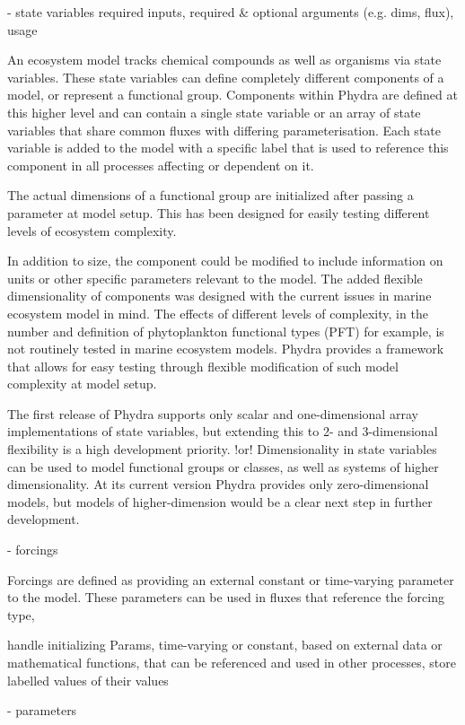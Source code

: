 \documentclass[journal abbreviation, manuscript]{copernicus}
\begin{document}
- state variables
required inputs, required \& optional arguments (e.g. dims, flux), usage

An ecosystem model tracks chemical compounds as well as organisms via state variables. These state variables can define completely different components of a model, or represent a functional group. Components within Phydra are defined at this higher level and can contain a single state variable or an array of state variables that share common fluxes with differing parameterisation. Each state variable is added to the model with a specific label that is used to reference this component in all processes affecting or dependent on it. 

The actual dimensions of a functional group are initialized after passing a parameter at model setup. This has been designed for easily testing different levels of ecosystem complexity.

In addition to size, the component could be modified to include information on units or other specific parameters relevant to the model. The added flexible dimensionality of components was designed with the current issues in marine ecosystem model in mind. The effects of different levels of complexity, in the number and definition of phytoplankton functional types (PFT) for example, is not routinely tested in marine ecosystem models. Phydra provides a framework that allows for easy testing through flexible modification of such model complexity at model setup.

The first release of Phydra supports only scalar and one-dimensional array implementations of state variables, but extending this to 2- and 3-dimensional flexibility is a high development priority. 
!or!
Dimensionality in state variables can be used to model functional groups or classes, as well as systems of higher dimensionality. At its current version Phydra provides only zero-dimensional models, but models of higher-dimension would be a clear next step in further development.

- forcings

Forcings are defined as providing an external constant or time-varying parameter to the model. These parameters can be used in fluxes that reference the forcing type,

handle initializing Params, time-varying or constant, based on external data or mathematical functions, that can be referenced and used in other processes, store labelled values of their values

- parameters
\end{document}
